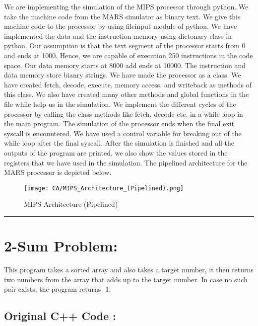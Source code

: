 \documentclass[a4paper,10pt]{article} %
\begin{document}
We are implementing the simulation of the MIPS processor through python. We take the machine code from the MARS simulator as binary text. We give this machine code to the processor by using fileinput module of python.
We have implemented the data and the instruction memory using dictonary class in python. Our assumption is that the text segment of the processor starts from 0 and ends at 1000. Hence, we are capable of execution 250 instructions in the code space. Our data memory starts at 8000 add ends at 10000. The instruction and data memory store bianry strings.
We have made the processor as a class. We have created fetch, decode, execute, memory access, and writeback as methods of this class. We also have created many other methods and global functions in the file while help us in the simulation.
We implement the different cycles of the processor by calling the class methods like fetch, decode etc. in a while loop in the main program. The simulation of the processor ends when the final exit syscall is encountered. We have used a control variable for breaking out of the while loop after the final syscall.
After the simulation is finished and all the outputs of the program are printed, we also show the values stored in the registers that we have used in the simulation.
The pipelined architecture for the MARS processor is depicted below.

\begin{figure}[H] %
    \centering
    \texttt{[image: CA/MIPS\_Architecture\_(Pipelined).png]}
    \caption{MIPS Architecture (Pipelined)}
    \label{fig:IAS Flow Chart}
\end{figure}

\newpage 

\rule{\textwidth}{0.5pt}
\section*{\huge{\textbf{2-Sum Problem:}}}

This program takes a sorted array and also takes a target number, it then returns two numbers from the array that adds up to the target number. In case no such pair exists, the program returns -1.

\subsection*{\Large{Original C++ Code :}}

\end{document}
